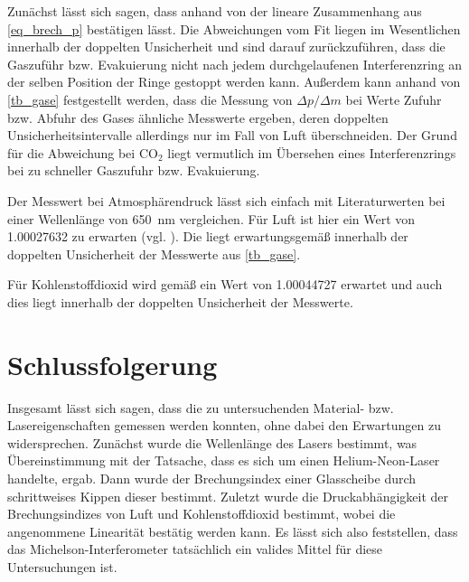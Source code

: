 \documentclass[
	a4paper,
	12pt,
	pagesize,
	ngerman
]{scrartcl}
\begin{document}
	Zunächst lässt sich sagen, dass anhand von  der lineare Zusammenhang aus \cref{eq_brech_p} bestätigen lässt.
	Die Abweichungen vom Fit liegen im Wesentlichen innerhalb der doppelten Unsicherheit und sind darauf zurückzuführen, dass die Gaszuführ bzw. Evakuierung nicht nach jedem durchgelaufenen Interferenzring an der selben Position der Ringe gestoppt werden kann.
	Außerdem kann anhand von \cref{tb_gase} festgestellt werden, dass die Messung von $\Delta p/\Delta m$ bei Werte Zufuhr bzw. Abfuhr des Gases ähnliche Messwerte ergeben, deren doppelten Unsicherheitsintervalle allerdings nur im Fall von Luft überschneiden.
	Der Grund für die Abweichung bei CO$_2$ liegt vermutlich im Übersehen eines Interferenzrings bei zu schneller Gaszufuhr bzw. Evakuierung.

	Der Messwert bei Atmosphärendruck lässt sich einfach mit Literaturwerten bei einer Wellenlänge von \SI{650}{nm} vergleichen.
	Für Luft ist hier ein Wert von \SI{1.00027632}{} zu erwarten (vgl. \cite{Brechungsindizes}).
	Die liegt erwartungsgemäß innerhalb der doppelten Unsicherheit der Messwerte aus \cref{tb_gase}.

	Für Kohlenstoffdioxid wird gemäß \cite{GlasFormula} ein Wert von \SI{1.00044727}{} erwartet und auch dies liegt innerhalb der doppelten Unsicherheit der Messwerte.

	\section{Schlussfolgerung}
	Insgesamt lässt sich sagen, dass die zu untersuchenden Material- bzw. Lasereigenschaften gemessen werden konnten, ohne dabei den Erwartungen zu widersprechen.
	Zunächst wurde die Wellenlänge des Lasers bestimmt, was Übereinstimmung mit der Tatsache, dass es sich um einen Helium-Neon-Laser handelte, ergab.
	Dann wurde der Brechungsindex einer Glasscheibe durch schrittweises Kippen dieser bestimmt.
	Zuletzt wurde die Druckabhängigkeit der Brechungsindizes von Luft und Kohlenstoffdioxid bestimmt, wobei die angenommene Linearität bestätig werden kann.
	Es lässt sich also feststellen, dass das Michelson-Interferometer tatsächlich ein valides Mittel für diese Untersuchungen ist. %

	\printbibliography
\end{document}
